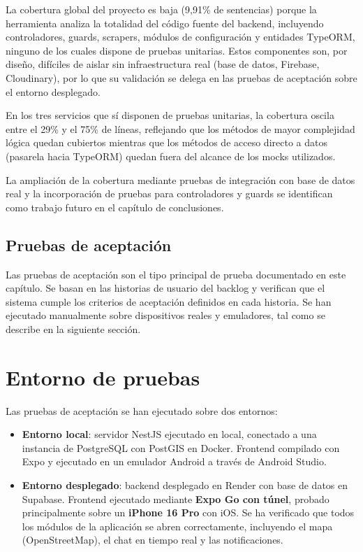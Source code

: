 La cobertura global del proyecto es baja (9,91\% de sentencias) porque la herramienta analiza la totalidad del código fuente del backend, incluyendo controladores, guards, scrapers, módulos de configuración y entidades TypeORM, ninguno de los cuales dispone de pruebas unitarias. Estos componentes son, por diseño, difíciles de aislar sin infraestructura real (base de datos, Firebase, Cloudinary), por lo que su validación se delega en las pruebas de aceptación sobre el entorno desplegado.

En los tres servicios que sí disponen de pruebas unitarias, la cobertura oscila entre el 29\% y el 75\% de líneas, reflejando que los métodos de mayor complejidad lógica quedan cubiertos mientras que los métodos de acceso directo a datos (pasarela hacia TypeORM) quedan fuera del alcance de los mocks utilizados.

La ampliación de la cobertura mediante pruebas de integración con base de datos real y la incorporación de pruebas para controladores y guards se identifican como trabajo futuro en el capítulo de conclusiones.

\subsection{Pruebas de aceptación}

Las pruebas de aceptación son el tipo principal de prueba documentado en este capítulo. Se basan en las historias de usuario del backlog y verifican que el sistema cumple los criterios de aceptación definidos en cada historia. Se han ejecutado manualmente sobre dispositivos reales y emuladores, tal como se describe en la siguiente sección.

\section{Entorno de pruebas}

Las pruebas de aceptación se han ejecutado sobre dos entornos:

\begin{itemize}
    \item \textbf{Entorno local}: servidor NestJS ejecutado en local, conectado a una instancia de PostgreSQL con PostGIS en Docker. Frontend compilado con Expo y ejecutado en un emulador Android a través de Android Studio.

    \item \textbf{Entorno desplegado}: backend desplegado en Render con base de datos en Supabase. Frontend ejecutado mediante \textbf{Expo Go con túnel}, probado principalmente sobre un \textbf{iPhone 16 Pro} con iOS. Se ha verificado que todos los módulos de la aplicación se abren correctamente, incluyendo el mapa (OpenStreetMap), el chat en tiempo real y las notificaciones.
\end{itemize}

